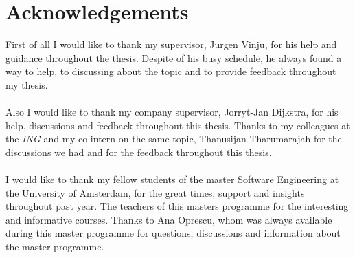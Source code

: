 \chapter*{Acknowledgements}
First of all I would like to thank my supervisor, Jurgen Vinju, for his help and
guidance throughout the thesis. Despite of his busy schedule, he always found a
way to help, to discussing about the topic and to provide feedback throughout my
thesis.\\
\\
Also I would like to thank my company supervisor, Jorryt-Jan Dijkstra,
for his help, discussions and feedback throughout this thesis. Thanks to my
colleagues at the \textit{ING} and my co-intern on the same topic, Thanusijan
Tharumarajah for the discussions we had and for the feedback throughout this
thesis.\\
\\
I would like to thank my fellow students of the master Software Engineering at the University of Amsterdam, for
the great times, support and insights throughout past year. The teachers of this
masters programme for the interesting and informative courses. Thanks to Ana
Oprescu, whom was always available during this master programme for questions,
discussions and information about the master programme.

%



\appendix
